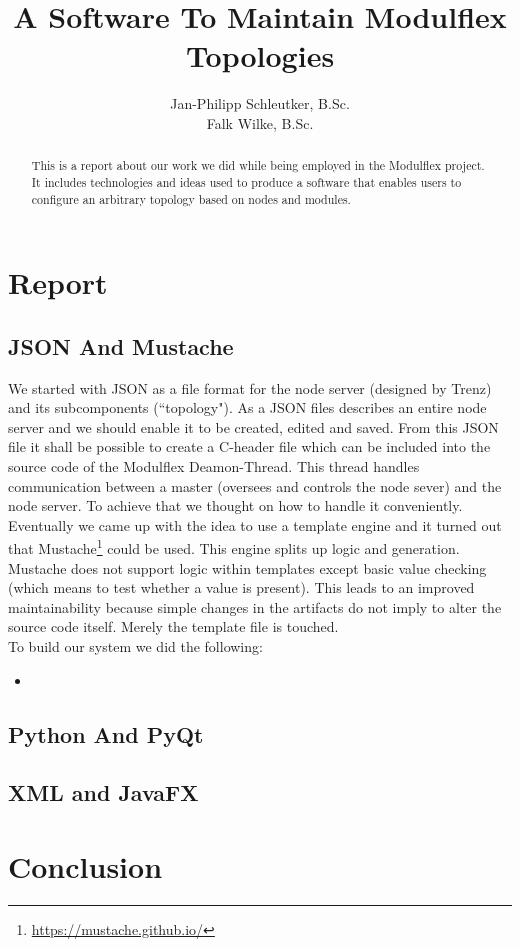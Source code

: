 \documentclass[10pt,a4paper]{report}
\begin{document}
	\title{A Software To Maintain Modulflex Topologies}
	\author{Jan-Philipp Schleutker, B.Sc.\\Falk Wilke, B.Sc.}
	\maketitle
	\begin{abstract}
		This is a report about our work we did while being employed in the Modulflex project. 
		It includes technologies and ideas used to produce a software that enables users to configure an arbitrary topology based on nodes and modules. 
	\end{abstract}
	\tableofcontents
	
	\chapter{Report}
	
	\section{JSON And Mustache}
	
	We started with JSON as a file format for the node server (designed by Trenz) and its subcomponents (``topology"). 
	As a JSON files describes an entire node server and we should enable it to be created, edited and saved. From this JSON file it shall be possible to create a C-header file which can be included into the source code of the Modulflex Deamon-Thread. This thread handles communication between a master (oversees and controls the node sever) and the node server.
	To achieve that we thought on how to handle it conveniently. Eventually we came up with the idea to use a template engine and it turned out that Mustache\footnote{\url{https://mustache.github.io/}} could be used. This engine splits up logic and generation. Mustache does not support logic within templates except basic value checking (which means to test whether a value is present). This leads to an improved maintainability because simple changes in the artifacts do not imply to alter the source code itself. Merely the template file is touched. \\
	To build our system we did the following:
	
	\begin{itemize}
		\item 
	\end{itemize}
	
	\section{Python And PyQt}
	
	\section{XML and JavaFX}
	
	\chapter{Conclusion}
\end{document}
